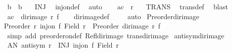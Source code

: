 \begin{isabellebody}
\ {\isachardoublequoteopen}b{}\ {\isacharequal}{\kern0pt}\ b{}{\isachardoublequoteclose}\ \isamarkupfalse%
\ {}\ INJ\ \isamarkupfalse%
\ inj{\isacharunderscore}{\kern0pt}on{\isacharunderscore}{\kern0pt}def\ \isamarkupfalse%
\ auto\isanewline
\ \ \isamarkupfalse%
\ {\isachardoublequoteopen}{\isacharparenleft}{\kern0pt}a{\isacharcomma}{\kern0pt}c{\isacharparenright}{\kern0pt}\ {\isasymin}\ r{\isachardoublequoteclose}\ \isamarkupfalse%
\ {}\ TRANS\ \isamarkupfalse%
\ trans{\isacharunderscore}{\kern0pt}def\ \isamarkupfalse%
\ blast\isanewline
\ \ \isamarkupfalse%
\ {\isachardoublequoteopen}{\isacharparenleft}{\kern0pt}a{\isacharprime}{\kern0pt}{\isacharcomma}{\kern0pt}c{\isacharprime}{\kern0pt}{\isacharparenright}{\kern0pt}\ {\isasymin}\ dir{\isacharunderscore}{\kern0pt}image\ r\ f{\isachardoublequoteclose}\isanewline
\ \ \isamarkupfalse%
\ dir{\isacharunderscore}{\kern0pt}image{\isacharunderscore}{\kern0pt}def\ \isamarkupfalse%
\ {}\ \isamarkupfalse%
\ auto\isanewline
{}\isamarkupfalse%
%
\endisatagproof
{\isafoldproof}%
%
\isadelimproof
\isanewline
%
\endisadelimproof
\isanewline
{}\isamarkupfalse%
\ Preorder{\isacharunderscore}{\kern0pt}dir{\isacharunderscore}{\kern0pt}image{\isacharcolon}{\kern0pt}\isanewline
{\isachardoublequoteopen}{\isasymlbrakk}Preorder\ r{\isacharsemicolon}{\kern0pt}\ inj{\isacharunderscore}{\kern0pt}on\ f\ {\isacharparenleft}{\kern0pt}Field\ r{\isacharparenright}{\kern0pt}{\isasymrbrakk}\ {\isasymLongrightarrow}\ Preorder\ {\isacharparenleft}{\kern0pt}dir{\isacharunderscore}{\kern0pt}image\ r\ f{\isacharparenright}{\kern0pt}{\isachardoublequoteclose}\isanewline
%
\isadelimproof
%
\endisadelimproof
%
\isatagproof
{}\isamarkupfalse%
\ {\isacharparenleft}{\kern0pt}simp\ add{\isacharcolon}{\kern0pt}\ preorder{\isacharunderscore}{\kern0pt}on{\isacharunderscore}{\kern0pt}def\ Refl{\isacharunderscore}{\kern0pt}dir{\isacharunderscore}{\kern0pt}image\ trans{\isacharunderscore}{\kern0pt}dir{\isacharunderscore}{\kern0pt}image{\isacharparenright}{\kern0pt}%
\endisatagproof
{\isafoldproof}%
%
\isadelimproof
\isanewline
%
\endisadelimproof
\isanewline
{}\isamarkupfalse%
\ antisym{\isacharunderscore}{\kern0pt}dir{\isacharunderscore}{\kern0pt}image{\isacharcolon}{\kern0pt}\isanewline
{}\ AN{\isacharcolon}{\kern0pt}\ {\isachardoublequoteopen}antisym\ r{\isachardoublequoteclose}\ \ INJ{\isacharcolon}{\kern0pt}\ {\isachardoublequoteopen}inj{\isacharunderscore}{\kern0pt}on\ f\ {\isacharparenleft}{\kern0pt}Field\ r{\isacharparenright}{\kern0pt}{\isachardoublequoteclose}\isanewline

\end{isabellebody}
